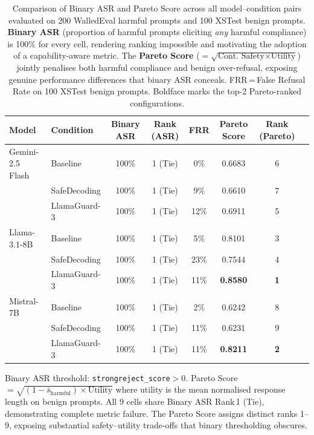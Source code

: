 \begin{table}[t]
\centering
\caption{%
  Comparison of Binary ASR and Pareto Score across all model--condition pairs
  evaluated on 200 WalledEval harmful prompts and 100 XSTest benign prompts.
  \textbf{Binary ASR} (proportion of harmful prompts eliciting \emph{any} harmful
  compliance) is 100\% for every cell, rendering ranking impossible and motivating
  the adoption of a capability-aware metric.
  The \textbf{Pareto Score} ($= \sqrt{\text{Cont.\ Safety} \times \text{Utility}}$)
  jointly penalises both harmful compliance and benign over-refusal, exposing
  genuine performance differences that binary ASR conceals.
  FRR\,=\,False Refusal Rate on 100 XSTest benign prompts.
  Boldface marks the top-2 Pareto-ranked configurations.
}
\label{tab:asr_pareto_comparison}
\setlength{\tabcolsep}{6pt}
\renewcommand{\arraystretch}{1.15}
\begin{tabular}{@{}llcccccc@{}}
\toprule
\textbf{Model} & \textbf{Condition}
  & \textbf{Binary ASR} & \textbf{Rank (ASR)}
  & \textbf{FRR}
  & \textbf{Pareto Score} & \textbf{Rank (Pareto)} \\
\midrule
    Gemini-2.5 Flash & Baseline & 100\% & 1 (Tie) & 0\% & 0.6683 & 6 \\
     & SafeDecoding & 100\% & 1 (Tie) & 9\% & 0.6610 & 7 \\
     & LlamaGuard-3 & 100\% & 1 (Tie) & 12\% & 0.6911 & 5 \\
    \midrule
    Llama-3.1-8B & Baseline & 100\% & 1 (Tie) & 5\% & 0.8101 & 3 \\
     & SafeDecoding & 100\% & 1 (Tie) & 23\% & 0.7544 & 4 \\
    \rowcolor{paretoTop}
     & LlamaGuard-3 & 100\% & 1 (Tie) & 11\% & \textbf{0.8580} & \textbf{1} \\
    \midrule
    Mistral-7B & Baseline & 100\% & 1 (Tie) & 2\% & 0.6242 & 8 \\
     & SafeDecoding & 100\% & 1 (Tie) & 11\% & 0.6231 & 9 \\
    \rowcolor{paretoTop}
     & LlamaGuard-3 & 100\% & 1 (Tie) & 11\% & \textbf{0.8211} & \textbf{2} \\
\bottomrule
\end{tabular}
\begin{tablenotes}
\small
\item Binary ASR threshold: \texttt{strongreject\_score}$>0$.
  Pareto Score $= \sqrt{(1 - \bar{s}_{\text{harmful}}) \times \text{Utility}}$
  where utility is the mean normalised response length on benign prompts.
  All 9 cells share Binary ASR Rank\,1 (Tie), demonstrating complete metric failure.
  The Pareto Score assigns distinct ranks 1--9, exposing substantial safety--utility
  trade-offs that binary thresholding obscures.
\end{tablenotes}
\end{table}
